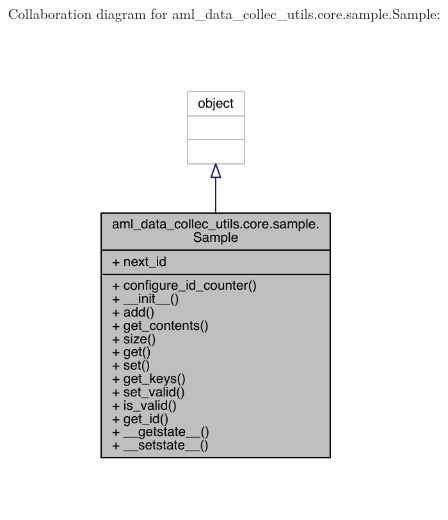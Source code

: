 Collaboration diagram for aml\+\_\+data\+\_\+collec\+\_\+utils.\+core.\+sample.\+Sample\+:
\nopagebreak
\begin{figure}[H]
\begin{center}
\leavevmode
\includegraphics[width=252pt]{classaml__data__collec__utils_1_1core_1_1sample_1_1_sample__coll__graph}
\end{center}
\end{figure}
